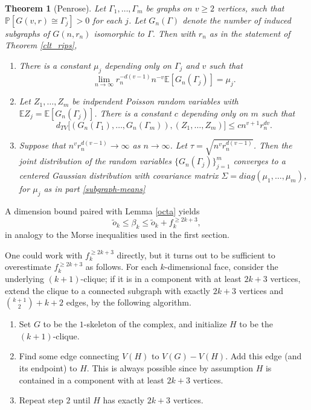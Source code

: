 \documentclass{amsart}
\newtheorem{thm}{Theorem}[section]
\theoremstyle{definition}
\newcommand{\E}{\mathbb{E}}
\renewcommand{\P}{\mathbb{P}}
\renewcommand{\1}{\mathbb{1}}
\begin{document}
\begin{thm}[Penrose]\label{subgraph-clt}
Let $\Gamma_1,\ldots,\Gamma_m$ be graphs on $v\ge2$ vertices, such that
$\P[G(v,r)\cong \Gamma_j]>0$ for each $j$.  Let $G_n(\Gamma)$ denote
the number of induced subgraphs of $G(n,r_n)$ isomorphic to $\Gamma$.
Then with $r_n$ as in the 
statement of Theorem \ref{clt_rips}, 
\begin{enumerate}
\item \label{subgraph-means}
There is a constant $\mu_j$ depending only on $\Gamma_j$ and $v$
such that $$\lim_{n\to\infty}r_n^{-d(v-1)}n^{-v}\E[G_n(\Gamma_j)]=\mu_j.$$

\item Let $Z_1,\ldots,Z_m$ be indpendent Poisson random variables with 
$\E Z_j=\E[G_n(\Gamma_j)]$.  There is a constant $c$ depending only on $m$
such that
$$d_{TV}\big[(G_n(\Gamma_1),\ldots,G_n(\Gamma_m)),(Z_1,\ldots,Z_m)\big]\le
cn^{v+1}r_n^{dv}.$$

\item Suppose that $n^vr_n^{d(v-1)}\to\infty$ as $n\to\infty$.  Let 
$\tau=\sqrt{n^vr_n^{d(v-1)}}$.  Then the joint distribution of the random
variables $\{G_n(\Gamma_j)\}_{j=1}^m$ converges to a centered Gaussian 
distribution with covariance matrix $\Sigma=diag(\mu_1,\ldots,\mu_m)$,
for $\mu_j$ as in part \ref{subgraph-means}

\end{enumerate}

\end{thm}
 
A dimension bound paired with Lemma \ref{octa} yields 
\begin{equation}\label{octo-morse}
\tilde{o}_k \le \beta_k \le \tilde{o}_k + f_k^{\ge 2k+3},
\end{equation}
in analogy to the Morse
inequalities used in the first section.

One could work with $f_k^{\ge 2k+3}$ directly, but it turns out to be sufficient 
 to overestimate $f_k^{\ge 2k+3}$ as follows.  For each 
$k$-dimensional face, consider the underlying 
$(k+1)$-clique; if it is in a component
with at least $2k+3$ vertices, extend the clique to a connected
subgraph with exactly $2k+3$ vertices and ${k+1 \choose 2} + k+2$
edges, by the following algorithm.

\begin{enumerate}
\item Set $G$ to be the $1$-skeleton of
  the complex, and initialize $H$ to be the $(k+1)$-clique.
\item Find some edge connecting $V(H)$ to $V(G) - V(H)$.  Add this
  edge (and its endpoint) to $H$.  This is always possible since by
  assumption $H$ is contained in a component with at least $2k+3$
  vertices.
\item Repeat step $2$ until $H$ has exactly $2k+3$ vertices.
\end{enumerate}
\end{document}

